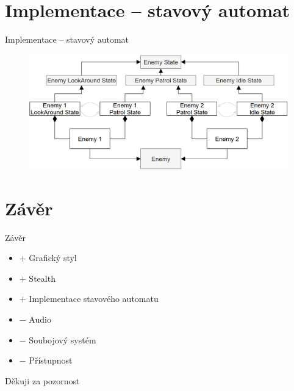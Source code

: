 \documentclass[10pt]{beamer}
\begin{document}
	\section{Implementace – stavový automat}
	\begin{frame}{Implementace – stavový automat}
		\begin{figure}[h]
			\centering
			\includegraphics[width=\textwidth]{Images/FSM_Specific}
		\end{figure}		
	\end{frame}

	\section{Závěr}
	\begin{frame}{Závěr}
		\begin{itemize}\setlength\itemsep{10pt}
			\item $+$ Grafický styl
			\item $+$ Stealth
			\item $+$ Implementace stavového automatu
			\item $-$ Audio
			\item $-$ Soubojový systém
			\item $-$ Přístupnost
		\end{itemize}
	\end{frame}

	{
	\begin{frame}[noframenumbering] %
		Děkuji za pozornost
	\end{frame}
	}
	
\end{document}
